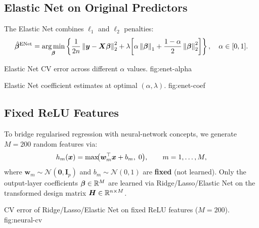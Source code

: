 \subsection{Elastic Net on Original Predictors}
\label{sec:enet-original}

The Elastic Net \citep{ZouHastie2005} combines $\ell_1$ and $\ell_2$ penalties:
\[
    \hat{\bm{\beta}}^{\mathrm{ENet}}
    = \operatorname*{arg\,min}_{\bm{\beta}}
      \left\{
          \frac{1}{2n} \left\lVert \bm{y} - \bm{X}\bm{\beta} \right\rVert_2^2
          + \lambda\!\left[
              \alpha \left\lVert \bm{\beta} \right\rVert_1
              + \frac{1 - \alpha}{2} \left\lVert \bm{\beta} \right\rVert_2^2
          \right]
      \right\},
    \quad \alpha \in [0, 1].
\]

%
    {Elastic Net CV error across different $\alpha$ values.}%
    {fig:enet-alpha}

%
    {Elastic Net coefficient estimates at optimal $(\alpha, \lambda)$.}%
    {fig:enet-coef}


\subsection{Fixed ReLU Features}
\label{sec:relu-features}

To bridge regularised regression with neural-network concepts, we generate
$M = 200$ random features via:
\[
    h_m(\bm{x}) = \max\!\bigl(\bm{w}_m^\top \bm{x} + b_m,\; 0\bigr),
    \qquad m = 1, \dots, M,
\]
where $\bm{w}_m \sim \mathcal{N}(\bm{0}, \bm{I}_p)$ and
$b_m \sim \mathcal{N}(0, 1)$ are \textbf{fixed} (not learned).
Only the output-layer coefficients $\bm{\beta} \in \mathbb{R}^M$ are learned via
Ridge/Lasso/Elastic Net on the transformed design matrix
$\bm{H} \in \mathbb{R}^{n \times M}$.

%
    {CV error of Ridge/Lasso/Elastic Net on fixed ReLU features ($M = 200$).}%
    {fig:neural-cv}


